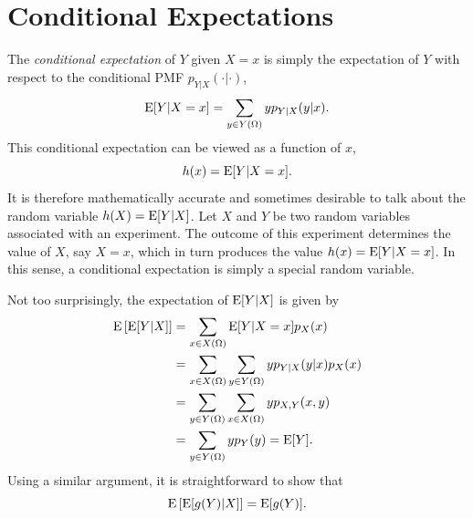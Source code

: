 \section{Conditional Expectations}

The \emph{conditional expectation} of $Y$ given $X = x$ is simply the expectation of $Y$ with respect to the conditional PMF $p_{Y|X} (\cdot | \cdot)$, 
\begin{equation*}
\mathrm{E} [Y | X = x ] = \sum_{y \in Y(\Omega)} y p_{Y|X} (y|x).
\end{equation*}
This conditional expectation can be viewed as a function of $x$,
\begin{equation*}
h(x) = \mathrm{E} [Y | X = x] .
\end{equation*}
It is therefore mathematically accurate and sometimes desirable to talk about the random variable $h (X) = \mathrm{E} [Y | X]$.
Let $X$ and $Y$ be two random variables associated with an experiment.
The outcome of this experiment determines the value of $X$, say $X = x$, which in turn produces the value $h(x) = \mathrm{E} [Y | X = x]$.
In this sense, a conditional expectation is simply a special random variable.

Not too surprisingly, the expectation of $\mathrm{E} [Y | X]$ is given by
\begin{equation*}
\begin{split}
\mathrm{E} \left[ \mathrm{E} [Y | X] \right]
&= \sum_{x \in X(\Omega)} \mathrm{E} [Y | X = x] p_X (x) \\
&= \sum_{x \in X(\Omega)} \sum_{y \in Y(\Omega)} y p_{Y|X} (y|x) p_X (x) \\
&= \sum_{y \in Y(\Omega)} \sum_{x \in X(\Omega)} y p_{X,Y} (x, y) \\
&= \sum_{y \in Y(\Omega)} y p_{Y} (y)
= \mathrm{E} [Y] .
\end{split}
\end{equation*}
Using a similar argument, it is straightforward to show that
\begin{equation*}
\mathrm{E} \left[ \mathrm{E} [g (Y) | X] \right] = \mathrm{E} [g(Y)] .
\end{equation*}

